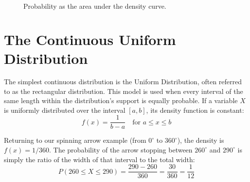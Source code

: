 \documentclass[12pt]{scrartcl}
\begin{document}
\begin{figure}[H]
	\centering
	\caption{Probability as the area under the density curve.}
\end{figure}

\section{The Continuous Uniform Distribution}

The simplest continuous distribution is the Uniform Distribution, often referred to as the rectangular distribution. This model is used when every interval of the same length within the distribution's support is equally probable. If a variable $X$ is uniformly distributed over the interval $[a, b]$, its density function is constant:
\begin{equation}
	f(x) = \frac{1}{b - a} \quad \text{for } a \le x \le b
\end{equation}

Returning to our spinning arrow example (from $0^\circ$ to $360^\circ$), the density is $f(x) = 1/360$. The probability of the arrow stopping between $260^\circ$ and $290^\circ$ is simply the ratio of the width of that interval to the total width:
\begin{equation}
	P(260 \le X \le 290) = \frac{290 - 260}{360} = \frac{30}{360} = \frac{1}{12}
\end{equation}
\end{document}
